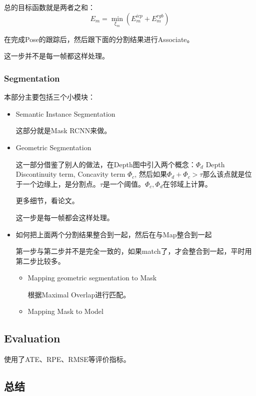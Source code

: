 总的目标函数就是两者之和：
\begin{displaymath}
E_m = \min_{\xi_m} \left( E_m^{icp} + E_m^{rgb} \right) 
\end{displaymath}

在完成Pose的跟踪后，然后跟下面的分割结果进行Associate。

这一步并不是每一帧都这样处理。

\subsubsection{Segmentation}

本部分主要包括三个小模块：
\begin{itemize}
\item Semantic Instance Segmentation

这部分就是Mask RCNN来做。

\item Geometric Segmentation

这一部分借鉴了别人的做法，在Depth图中引入两个概念：$\Phi_d$ Depth Discontinuity term, Concavity term $\Phi_c$, 然后如果$\Phi_d + \Phi_c > \tau$那么该点就是位于一个边缘上，是分割点。$\tau$是一个阈值。$\Phi_c, \Phi_d$在邻域上计算。

更多细节，看论文。

这一步是每一帧都会这样处理。

\item 如何把上面两个分割结果整合到一起，然后在与Map整合到一起

第一步与第二步并不是完全一致的，如果match了，才会整合到一起，平时用第二步比较多。

\begin{itemize}
\item Mapping geometric segmentation to Mask

根据Maximal Overlap进行匹配。

\item Mapping Mask to Model

\end{itemize}
\end{itemize}

\subsection{Evaluation}

使用了ATE、RPE、RMSE等评价指标。

\subsection{总结}

